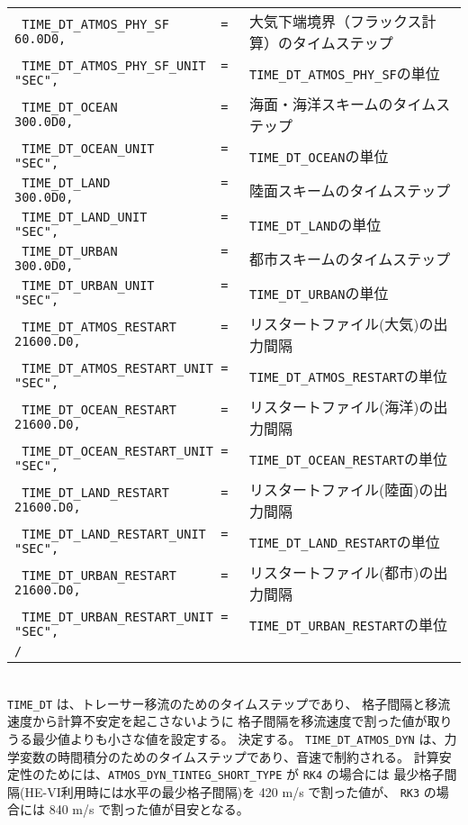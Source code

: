 {{{\begin{tabularx}{140mm}{lX}
\verb| TIME_DT_ATMOS_PHY_SF       = 60.0D0, | & 大気下端境界（フラックス計算）のタイムステップ\\
\verb| TIME_DT_ATMOS_PHY_SF_UNIT  = "SEC",  | & \verb|TIME_DT_ATMOS_PHY_SF|の単位\\
\verb| TIME_DT_OCEAN              = 300.0D0,| & 海面・海洋スキームのタイムステップ\\
\verb| TIME_DT_OCEAN_UNIT         = "SEC",  | & \verb|TIME_DT_OCEAN|の単位\\
\verb| TIME_DT_LAND               = 300.0D0,| & 陸面スキームのタイムステップ\\
\verb| TIME_DT_LAND_UNIT          = "SEC",  | & \verb|TIME_DT_LAND|の単位\\
\verb| TIME_DT_URBAN              = 300.0D0,| & 都市スキームのタイムステップ\\
\verb| TIME_DT_URBAN_UNIT         = "SEC",  | & \verb|TIME_DT_URBAN|の単位\\
\verb| TIME_DT_ATMOS_RESTART      = 21600.D0, | & リスタートファイル(大気)の出力間隔\\
\verb| TIME_DT_ATMOS_RESTART_UNIT = "SEC",    | & \verb|TIME_DT_ATMOS_RESTART|の単位\\
\verb| TIME_DT_OCEAN_RESTART      = 21600.D0, | & リスタートファイル(海洋)の出力間隔\\
\verb| TIME_DT_OCEAN_RESTART_UNIT = "SEC",    | & \verb|TIME_DT_OCEAN_RESTART|の単位\\
\verb| TIME_DT_LAND_RESTART       = 21600.D0, | & リスタートファイル(陸面)の出力間隔\\
\verb| TIME_DT_LAND_RESTART_UNIT  = "SEC",    | & \verb|TIME_DT_LAND_RESTART|の単位\\
\verb| TIME_DT_URBAN_RESTART      = 21600.D0, | & リスタートファイル(都市)の出力間隔\\
\verb| TIME_DT_URBAN_RESTART_UNIT = "SEC",    | & \verb|TIME_DT_URBAN_RESTART|の単位\\
\verb|/|\\
\end{tabularx}
}}}\\


\verb|TIME_DT| は、トレーサー移流のためのタイムステップであり、
格子間隔と移流速度から計算不安定を起こさないように
格子間隔を移流速度で割った値が取りうる最少値よりも小さな値を設定する。
決定する。
\verb|TIME_DT_ATMOS_DYN| は、力学変数の時間積分のためのタイムステップであり、音速で制約される。
計算安定性のためには、\verb|ATMOS_DYN_TINTEG_SHORT_TYPE| が \verb|RK4| の場合には
最少格子間隔(HE-VI利用時には水平の最少格子間隔)を 420 m/s で割った値が、
\verb|RK3| の場合には 840 m/s で割った値が目安となる。



